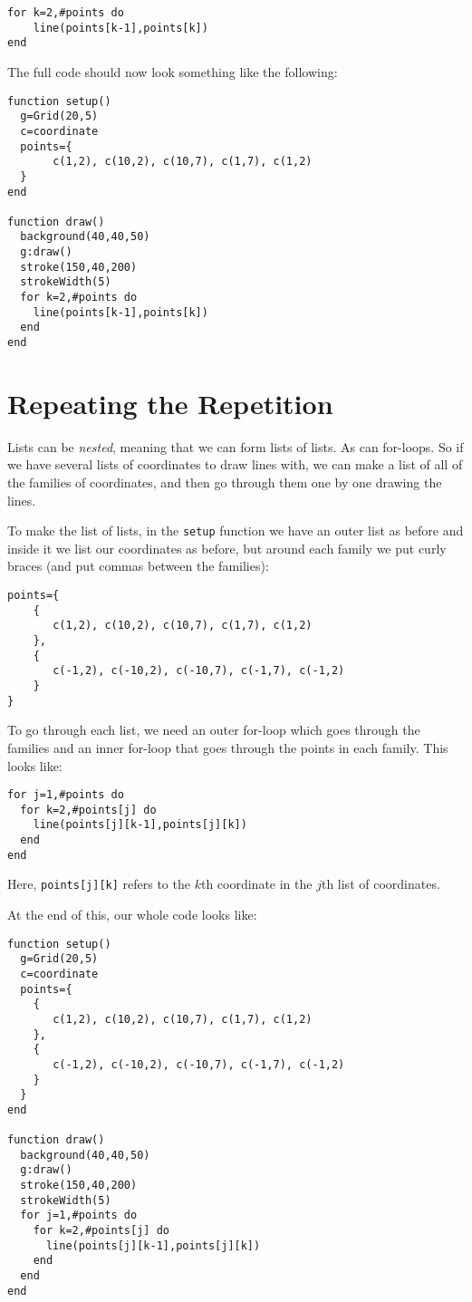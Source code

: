 \documentclass[
  xhtml,%
  text
]{internet}
\begin{document}
\begin{verbatim}
for k=2,#points do
    line(points[k-1],points[k])
end
\end{verbatim}

The full code should now look something like the following:

\begin{verbatim}
function setup()
  g=Grid(20,5)
  c=coordinate
  points={
       c(1,2), c(10,2), c(10,7), c(1,7), c(1,2)
  }
end

function draw()
  background(40,40,50)
  g:draw()
  stroke(150,40,200)
  strokeWidth(5)
  for k=2,#points do
    line(points[k-1],points[k])
  end
end
\end{verbatim}

\section*{Repeating the Repetition}

Lists can be \emph{nested}, meaning that we can form lists of lists.
As can for-loops.
So if we have several lists of coordinates to draw lines with, we can make a list of all of the families of coordinates, and then go through them one by one drawing the lines.

To make the list of lists, in the \verb+setup+ function we have an outer list as before and inside it we list our coordinates as before, but around each family we put curly braces (and put commas between the families):

\begin{verbatim}
points={
    {
       c(1,2), c(10,2), c(10,7), c(1,7), c(1,2)
    },
    {
       c(-1,2), c(-10,2), c(-10,7), c(-1,7), c(-1,2)
    }
}
\end{verbatim}

To go through each list, we need an outer for-loop which goes through the families and an inner for-loop that goes through the points in each family.
This looks like:

\begin{verbatim}
for j=1,#points do
  for k=2,#points[j] do
    line(points[j][k-1],points[j][k])
  end
end
\end{verbatim}

Here, \verb+points[j][k]+ refers to the \(k\)th coordinate in the \(j\)th list of coordinates.

At the end of this, our whole code looks like:

\begin{verbatim}
function setup()
  g=Grid(20,5)
  c=coordinate
  points={
    {
       c(1,2), c(10,2), c(10,7), c(1,7), c(1,2)
    },
    {
       c(-1,2), c(-10,2), c(-10,7), c(-1,7), c(-1,2)
    }
  }
end

function draw()
  background(40,40,50)
  g:draw()
  stroke(150,40,200)
  strokeWidth(5)
  for j=1,#points do
    for k=2,#points[j] do
      line(points[j][k-1],points[j][k])
    end
  end
end
\end{verbatim}
\end{document}
